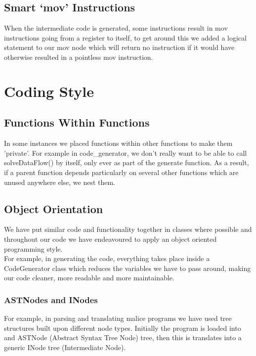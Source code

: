 \documentclass[a4wide, 11pt]{article}
\begin{document}
\subsection{Smart `mov' Instructions}
When the intermediate code is generated, some instructions result in mov instructions going from a register to itself, to get around this we added a logical statement to our mov node which will return no instruction if it would have otherwise resulted in a pointless mov instruction.

\section{Coding Style}
\subsection{Functions Within Functions}
In some instances we placed functions within other functions to make them 'private'. For example in code\_generator, we don't really want to be able to call solveDataFlow() by itself, only ever as part of the generate function. As a result, if a parent function depends particularly on several other functions which are unused anywhere else, we nest them.

\subsection{Object Orientation}
We have put similar code and functionality together in classes where possible and throughout our code we have endeavoured to apply an object oriented programming style.
\\
For example, in generating the code, everything takes place inside a CodeGenerator class which reduces the variables we have to pass around, making our code cleaner, more readable and more maintainable.
\\
\subsubsection{ASTNodes and INodes}
For example, in parsing and translating malice programs we have used tree structures built upon different node types. Initially the program is loaded into and ASTNode (Abstract Syntax Tree Node) tree, then this is translates into a generic INode tree (Intermediate Node).
\end{document}

